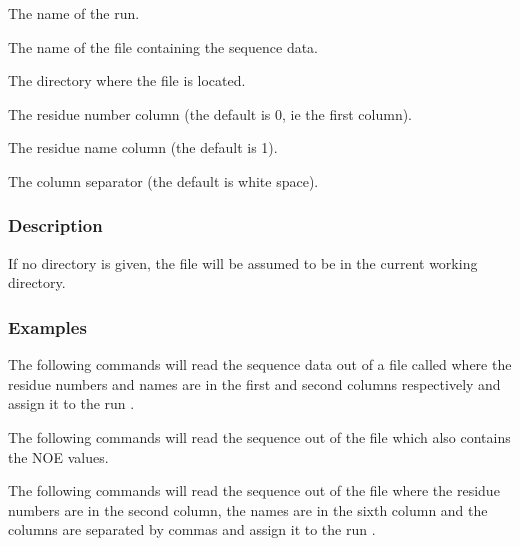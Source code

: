   The name of the run.

  The name of the file containing the sequence  data.

  The directory where the file is located.

  The residue number column (the default is 0, ie the first column).

  The residue name column (the default is 1).

  The column separator (the default is white space).

\subsubsection{Description}

If no directory is given, the file will be assumed to be in the current working directory.


\subsubsection{Examples}

The following commands will read  the sequence  data out of a file called 
 where the
residue numbers and names are in the first and second columns respectively and assign it to
the run 
.






The following commands will read  the sequence  out of the file 
 which also contains
the NOE values.






The following commands will read  the sequence  out of the file 
 where the
residue numbers are in the second column, the names are in the sixth column and the columns
are separated by commas and assign it to the run 
.

